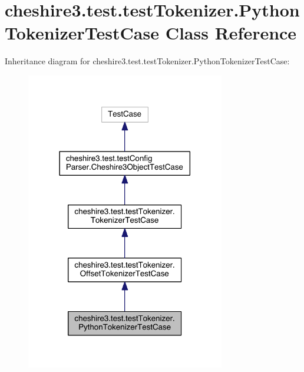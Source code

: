 \hypertarget{classcheshire3_1_1test_1_1test_tokenizer_1_1_python_tokenizer_test_case}{\section{cheshire3.\-test.\-test\-Tokenizer.\-Python\-Tokenizer\-Test\-Case Class Reference}
\label{classcheshire3_1_1test_1_1test_tokenizer_1_1_python_tokenizer_test_case}
}


Inheritance diagram for cheshire3.\-test.\-test\-Tokenizer.\-Python\-Tokenizer\-Test\-Case\-:
\nopagebreak
\begin{figure}[H]
\begin{center}
\leavevmode
\includegraphics[width=246pt]{classcheshire3_1_1test_1_1test_tokenizer_1_1_python_tokenizer_test_case__inherit__graph}
\end{center}
\end{figure}



